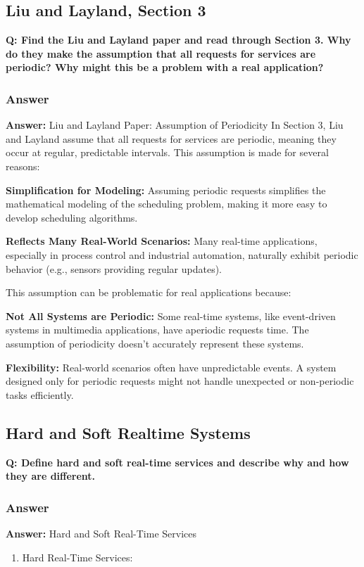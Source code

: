 \documentclass[a4paper,11pt]{article}%
\newenvironment{qanda}{\setlength{\parindent}{0pt}}{\bigskip}
\newcommand{\Q}{\bigskip\bfseries Q: }
\newcommand{\A}{\par\textbf{Answer: } \normalfont}
\begin{document}
\begin{qanda}
	\pagebreak
	\subsection{Liu and Layland, Section 3}
	\Q Find the Liu and Layland paper and read through Section 3. Why do they make the assumption that all
	requests for services are periodic? Why might this be a problem with a real application?
	\subsubsection{Answer}
	\A Liu and Layland Paper: Assumption of Periodicity
	In Section 3, Liu and Layland assume that all requests for services are periodic, meaning they occur at regular, predictable intervals. This assumption is made for several reasons:
	
	\textbf{Simplification for Modeling:} Assuming periodic requests simplifies the mathematical modeling of the scheduling problem, making it more easy to develop scheduling algorithms.
	
	\textbf{Reflects Many Real-World Scenarios:} Many real-time applications, especially in process control and industrial automation, naturally exhibit periodic behavior (e.g., sensors providing regular updates).
	
	This assumption can be problematic for real applications because:
	
	\textbf{Not All Systems are Periodic:} Some real-time systems, like event-driven systems in multimedia applications, have aperiodic requests time. The assumption of periodicity doesn't accurately represent these systems.
	
	\textbf{Flexibility:} Real-world scenarios often have unpredictable events. A system designed only for periodic requests might not handle unexpected or non-periodic tasks efficiently.
	
	\pagebreak
	\subsection{Hard and Soft Realtime Systems}
	\Q Define hard and soft real-time services and describe why and how they are different.
	\subsubsection{Answer}
	\A Hard and Soft Real-Time Services

	\begin{enumerate}[\hspace{1cm}1.]
		\item Hard Real-Time Services:
	

\end{enumerate}
\end{qanda}
\end{document}
